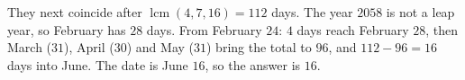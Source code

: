 They next coincide after $\operatorname{lcm}(4,7,16)=112$ days. The year $2058$ is not a leap year, so February has $28$ days. From February $24$: $4$ days reach February $28$, then March ($31$), April ($30$) and May ($31$) bring the total to $96$, and $112-96=16$ days into June. The date is June $16$, so the answer is $\boxed{16}$.
